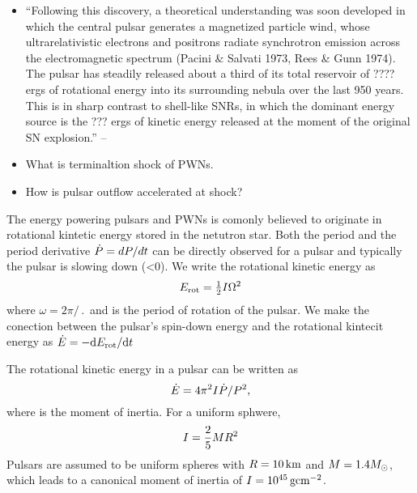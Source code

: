 
\begin{itemize}
  \item ``Following this discovery, a theoretical understanding was
  soon developed in which the central pulsar generates a magnetized
  particle wind, whose ultrarelativistic electrons and positrons radiate
  synchrotron emission across the electromagnetic spectrum (Pacini \&
  Salvati 1973, Rees \& Gunn 1974). The pulsar has steadily released
  about a third of its total reservoir of ???? ergs
  of rotational energy into its surrounding nebula over the last 950
  years. This is in sharp contrast to shell-like SNRs, in which the
  dominant energy source is the ??? ergs of kinetic energy
  released at the moment of the original SN explosion.''  -- \cite{gaensler_2006_evolution-structure}
  \item 
    What is terminaltion shock of \glspl{PWN}.
  \item 
    How is pulsar outflow accelerated at shock?
\end{itemize}



The energy powering pulsars and \glspl{PWN} is comonly
believed to originate in rotational kintetic energy stored in
the netutron star. 
Both the period \period and the period derivative
$\dot{P}=dP/dt$ can be directly observed for a pulsar
and typically the pulsar is slowing down (\perioddot<0).
We write the rotational kinetic energy as
\begin{equation}
  E_\text{rot} = \tfrac{1}{2} I \Omega^2
\end{equation}
where $\omega = 2\pi/\period$ and \period is the period of
rotation of the pulsar. We make the conection between
the pulsar's spin-down energy and the rotational kintecit energy as
$\dot{E} = - \text{d}E_\text{rot}/\text{d}t$

The rotational kinetic energy in a pulsar can be written as
\begin{equation}
  \dot{E} = 4\pi^2 I \dot{P}/P^2,
\end{equation}
where \momentofinertia is the moment of inertia.
For a uniform sphwere,
\begin{equation}
  I = \frac{2}{5} M R^2
\end{equation}
Pulsars are assumed to be uniform spheres with $R=10\,\text{km}$
and $M=1.4M_{\odot}$, which leads to a canonical moment of inertia of
$I=10^{45}\,\text{g}\text{cm}^{-2}$.

